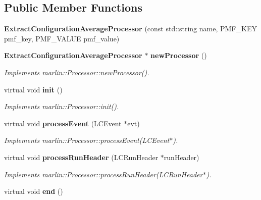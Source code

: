 \subsection*{Public Member Functions}
\begin{DoxyCompactItemize}
\item 
{\bfseries ExtractConfigurationAverageProcessor} (const std::string name, PMF\_\-KEY pmf\_\-key, PMF\_\-VALUE pmf\_\-value)\label{classCALICE_1_1ExtractConfigurationAverageProcessor_a8035f64050859ba76161f1432b37b457}

\item 
{\bf ExtractConfigurationAverageProcessor} $\ast$ {\bf newProcessor} ()\label{classCALICE_1_1ExtractConfigurationAverageProcessor_a077ce7a15806f9843796b912eb8fbce7}

\begin{DoxyCompactList}\small\item\em Implements marlin::Processor::newProcessor(). \item\end{DoxyCompactList}\item 
virtual void {\bf init} ()\label{classCALICE_1_1ExtractConfigurationAverageProcessor_a28b4116dd4ec68e02db2c9f2ee17fc74}

\begin{DoxyCompactList}\small\item\em Implements marlin::Processor::init(). \item\end{DoxyCompactList}\item 
virtual void {\bf processEvent} (LCEvent $\ast$evt)\label{classCALICE_1_1ExtractConfigurationAverageProcessor_a7e74ff5efd13293e12977cd11787dbc7}

\begin{DoxyCompactList}\small\item\em Implements marlin::Processor::processEvent(LCEvent$\ast$). \item\end{DoxyCompactList}\item 
virtual void {\bf processRunHeader} (LCRunHeader $\ast$runHeader)\label{classCALICE_1_1ExtractConfigurationAverageProcessor_a3549b7175d1d32b2103f25ead4f5a5fa}

\begin{DoxyCompactList}\small\item\em Implements marlin::Processor::processRunHeader(LCRunHeader$\ast$). \item\end{DoxyCompactList}\item 
virtual void {\bf end} ()\label{classCALICE_1_1ExtractConfigurationAverageProcessor_a877b167e8302d7330d3b2a595ed0e824}


\end{DoxyCompactItemize}
